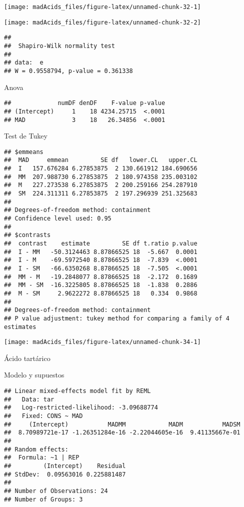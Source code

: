 \documentclass[
]{article}
\begin{document}
\begin{center}\texttt{[image: madAcids\_files/figure-latex/unnamed-chunk-32-1]} \end{center}

\begin{center}\texttt{[image: madAcids\_files/figure-latex/unnamed-chunk-32-2]} \end{center}

\begin{verbatim}
## 
##  Shapiro-Wilk normality test
## 
## data:  e
## W = 0.9558794, p-value = 0.361338
\end{verbatim}

Anova

\begin{verbatim}
##             numDF denDF    F-value p-value
## (Intercept)     1    18 4234.25715  <.0001
## MAD             3    18   26.34856  <.0001
\end{verbatim}

Test de Tukey

\begin{verbatim}
## $emmeans
##  MAD     emmean         SE df   lower.CL   upper.CL
##  I   157.676284 6.27853875  2 130.661912 184.690656
##  MM  207.988730 6.27853875  2 180.974358 235.003102
##  M   227.273538 6.27853875  2 200.259166 254.287910
##  SM  224.311311 6.27853875  2 197.296939 251.325683
## 
## Degrees-of-freedom method: containment 
## Confidence level used: 0.95 
## 
## $contrasts
##  contrast    estimate         SE df t.ratio p.value
##  I - MM   -50.3124463 8.87866525 18  -5.667  0.0001
##  I - M    -69.5972540 8.87866525 18  -7.839  <.0001
##  I - SM   -66.6350268 8.87866525 18  -7.505  <.0001
##  MM - M   -19.2848077 8.87866525 18  -2.172  0.1689
##  MM - SM  -16.3225805 8.87866525 18  -1.838  0.2886
##  M - SM     2.9622272 8.87866525 18   0.334  0.9868
## 
## Degrees-of-freedom method: containment 
## P value adjustment: tukey method for comparing a family of 4 estimates
\end{verbatim}

\begin{center}\texttt{[image: madAcids\_files/figure-latex/unnamed-chunk-34-1]} \end{center}

Ácido tartárico

Modelo y supuestos

\begin{verbatim}
## Linear mixed-effects model fit by REML
##   Data: tar 
##   Log-restricted-likelihood: -3.09688774
##   Fixed: CONS ~ MAD 
##     (Intercept)           MADMM            MADM           MADSM 
##  8.70989721e-17 -1.26351284e-16 -2.22044605e-16  9.41135667e-01 
## 
## Random effects:
##  Formula: ~1 | REP
##         (Intercept)    Residual
## StdDev:  0.09563016 0.225881487
## 
## Number of Observations: 24
## Number of Groups: 3
\end{verbatim}
\end{document}
